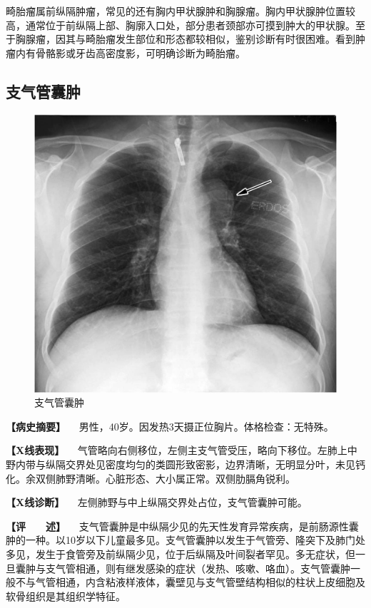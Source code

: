 畸胎瘤属前纵隔肿瘤，常见的还有胸内甲状腺肿和胸腺瘤。胸内甲状腺肿位置较高，通常位于前纵隔上部、胸廓入口处，部分患者颈部亦可摸到肿大的甲状腺。至于胸腺瘤，因其与畸胎瘤发生部位和形态都较相似，鉴别诊断有时很困难。看到肿瘤内有骨骼影或牙齿高密度影，可明确诊断为畸胎瘤。

\subsection{支气管囊肿}

\begin{figure}[!htbp]
 \centering
 \includegraphics{./images/Image00197.jpg}
 \captionsetup{justification=centering}
 \caption{支气管囊肿}
 \label{fig3-12-4}
  \end{figure} 

\textbf{【病史摘要】}
　男性，40岁。因发热3天摄正位胸片。体格检查：无特殊。

\textbf{【X线表现】}
　气管略向右侧移位，左侧主支气管受压，略向下移位。左肺上中野内带与纵隔交界处见密度均匀的类圆形致密影，边界清晰，无明显分叶，未见钙化。余双侧肺野清晰。心脏形态、大小属正常。双侧肋膈角锐利。

\textbf{【X线诊断】} 　左侧肺野与中上纵隔交界处占位，支气管囊肿可能。

\textbf{【评　　述】}
　支气管囊肿是中纵隔少见的先天性发育异常疾病，是前肠源性囊肿的一种。以10岁以下儿童最多见。支气管囊肿以发生于气管旁、隆突下及肺门处多见，发生于食管旁及前纵隔少见，位于后纵隔及叶间裂者罕见。多无症状，但一旦囊肿与支气管相通，则有继发感染的症状（发热、咳嗽、咯血）。支气管囊肿一般不与气管相通，内含粘液样液体，囊壁见与支气管壁结构相似的柱状上皮细胞及软骨组织是其组织学特征。


